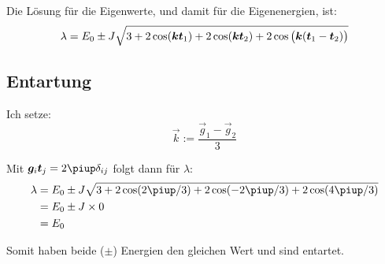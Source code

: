 Die Lösung für die Eigenwerte, und damit für die Eigenenergien, ist:
\[
	\lambda = E_0 \pm J \sqrt{3 + 2\cos(\vec k \vec t_1) + 2 \cos(\vec k \vec t_2) + 2 \cos\del{\vec k (\vec t_1 - \vec t_2)}}
\]

\subsection{Entartung}

Ich setze:
\[
	\vec k := \frac{\vec g_1 - \vec g_2}3
\]

Mit $\vec g_i \vec t_j = 2 \piup \delta_{ij}$ folgt dann für $\lambda$:
\begin{align*}
	\lambda
	&= E_0 \pm J \sqrt{3 + 2\cos(2\piup/3) + 2 \cos(-2\piup/3) + 2 \cos(4\piup/3)} \\
	&= E_0 \pm J \times 0 \\
	&= E_0
\end{align*}

Somit haben beide ($\pm$) Energien den gleichen Wert und sind entartet.


\IfFileExists{\bibliographyfile}{
	
}{}



